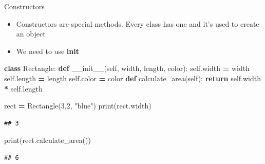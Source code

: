\documentclass[
  8pt,
  ignorenonframetext,
]{beamer}
\newenvironment{Shaded}{\begin{snugshade}}{\end{snugshade}}
\newcommand{\BuiltInTok}[1]{#1}
\newcommand{\ControlFlowTok}[1]{\textcolor[rgb]{0.13,0.29,0.53}{\textbf{#1}}}
\newcommand{\DecValTok}[1]{\textcolor[rgb]{0.00,0.00,0.81}{#1}}
\newcommand{\FunctionTok}[1]{\textcolor[rgb]{0.00,0.00,0.00}{#1}}
\newcommand{\KeywordTok}[1]{\textcolor[rgb]{0.13,0.29,0.53}{\textbf{#1}}}
\newcommand{\NormalTok}[1]{#1}
\newcommand{\OperatorTok}[1]{\textcolor[rgb]{0.81,0.36,0.00}{\textbf{#1}}}
\newcommand{\StringTok}[1]{\textcolor[rgb]{0.31,0.60,0.02}{#1}}
\newcommand{\VariableTok}[1]{\textcolor[rgb]{0.00,0.00,0.00}{#1}}
\begin{document}
\begin{frame}[fragile]{Constructors}
\protect\hypertarget{constructors}{}
\begin{itemize}
\item
  Constructors are special methods. Every class has one and it's used to
  create an object
\item
  We need to use \textbf{\textbf{init}}
\end{itemize}

\begin{Shaded}
\begin{Highlighting}[]
\KeywordTok{class}\NormalTok{ Rectangle:}
    \KeywordTok{def} \FunctionTok{\_\_init\_\_}\NormalTok{(}\VariableTok{self}\NormalTok{, width, length, color):}
        \VariableTok{self}\NormalTok{.width }\OperatorTok{=}\NormalTok{ width}
        \VariableTok{self}\NormalTok{.length }\OperatorTok{=}\NormalTok{ length}
        \VariableTok{self}\NormalTok{.color }\OperatorTok{=}\NormalTok{ color}
    \KeywordTok{def}\NormalTok{ calculate\_area(}\VariableTok{self}\NormalTok{):}
      \ControlFlowTok{return} \VariableTok{self}\NormalTok{.width }\OperatorTok{*} \VariableTok{self}\NormalTok{.length}
        
\NormalTok{rect }\OperatorTok{=}\NormalTok{ Rectangle(}\DecValTok{3}\NormalTok{,}\DecValTok{2}\NormalTok{, }\StringTok{"blue"}\NormalTok{)}
\BuiltInTok{print}\NormalTok{(rect.width)}
\end{Highlighting}
\end{Shaded}

\begin{verbatim}
## 3
\end{verbatim}

\begin{Shaded}
\begin{Highlighting}[]
\BuiltInTok{print}\NormalTok{(rect.calculate\_area())}
\end{Highlighting}
\end{Shaded}

\begin{verbatim}
## 6
\end{verbatim}
\end{frame}
\end{document}

